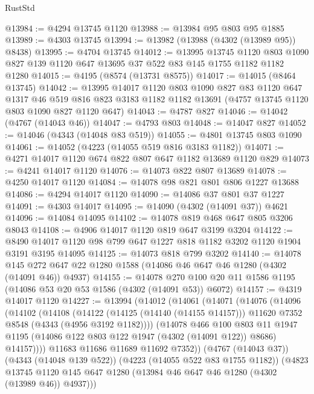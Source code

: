 \begin{lexlean}{RustStd}
\begin{coremodule}
@13984 := @4294 @13745 @1120
@13988 := @13984 @95 @803 @95 @1885
@13989 := @4303 @13745
@13994 := @13982 (@13988 (@4302 (@13989 @95)) @8438)
@13995 := @4704 @13745
@14012 := @13995
    @13745
    @1120
    @803
    @1090
    @827
    @139
    @1120
    @647
    @13695
    @37
    @522
    @83
    @145
    @1755
    @1182
    @1182
    @1280
@14015 := @4195 (@8574 (@13731 @8575))
@14017 := @14015 (@8464 @13745)
@14042 := @13995
    @14017
    @1120
    @803
    @1090
    @827
    @83
    @1120
    @647
    @1317
    @46
    @519
    @816
    @823
    @3183
    @1182
    @1182
    @13691
    (@4757 @13745 @1120 @803 @1090 @827 @1120 @647)
@14043 := @4787 @827
@14046 := @14042 (@4767 (@14043 @46))
@14047 := @4793 @803
@14048 := @14047 @827
@14052 := @14046 (@4343 (@14048 @83 @519))
@14055 := @4801 @13745 @803 @1090
@14061 := @14052 (@4223 (@14055 @519 @816 @3183 @1182))
@14071 := @4271 @14017 @1120 @674 @822 @807 @647 @1182 @13689 @1120 @829
@14073 := @4241 @14017 @1120
@14076 := @14073 @822 @807 @13689
@14078 := @4250 @14017 @1120
@14084 := @14078 @98 @821 @801 @806 @1227 @13688
@14086 := @4294 @14017 @1120
@14090 := @14086 @37 @801 @37 @1227
@14091 := @4303 @14017
@14095 := @14090 (@4302 (@14091 @37)) @4621
@14096 := @14084 @14095
@14102 := @14078 @819 @468 @647 @805 @3206 @8043
@14108 := @4906 @14017 @1120 @819 @647 @3199 @3204
@14122 := @8490 @14017 @1120 @98 @799 @647 @1227 @818 @1182 @3202 @1120 @1904 @3191 @3195 @14095
@14125 := @14073 @818 @799 @3202
@14140 := @14078
    @145
    @272
    @647
    @22
    @1280
    @1588
    (@14086 @46 @647 @46 @1280 (@4302 (@14091 @46)) @4937)
@14155 := @14078 @270 @100 @20 @11 @1586 @1195 (@14086 @53 @20 @53 @1586 (@4302 (@14091 @53)) @6072)
@14157 := @4319 @14017 @1120
@14227 := @13994
    (@14012
      (@14061
        (@14071
          (@14076
            (@14096
              (@14102
                (@14108
                  (@14122
                    (@14125 (@14140 (@14155 @14157)))
                    @11620
                    @7352
                    @8548
                    (@4343 (@4956 @3192 @1182))))
                (@14078
                  @466
                  @100
                  @803
                  @11
                  @1947
                  @1195
                  (@14086 @122 @803 @122 @1947 (@4302 (@14091 @122)) @8686)
                  @14157))))
          @11683
          @11686
          @11689
          @11692
          @7352))
      (@4767 (@14043 @37))
      (@4343 (@14048 @139 @522))
      (@4223 (@14055 @522 @83 @1755 @1182))
      (@4823 @13745 @1120 @145 @647 @1280 (@13984 @46 @647 @46 @1280 (@4302 (@13989 @46)) @4937)))

\end{coremodule}
\end{lexlean}
